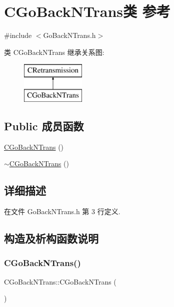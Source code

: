 \hypertarget{class_c_go_back_n_trans}{}\section{C\+Go\+Back\+N\+Trans类 参考}
\label{class_c_go_back_n_trans}


{\ttfamily \#include $<$Go\+Back\+N\+Trans.\+h$>$}

类 C\+Go\+Back\+N\+Trans 继承关系图\+:\begin{figure}[H]
\begin{center}
\leavevmode
\includegraphics[height=2.000000cm]{class_c_go_back_n_trans}
\end{center}
\end{figure}
\subsection*{Public 成员函数}
\begin{DoxyCompactItemize}
\item 
\hyperlink{class_c_go_back_n_trans_a75357c4a28d9948f86d317045f44fb62}{C\+Go\+Back\+N\+Trans} ()
\item 
\hyperlink{class_c_go_back_n_trans_aacaab4e6b5a5d2bae788a10f3c78d417}{$\sim$\+C\+Go\+Back\+N\+Trans} ()
\end{DoxyCompactItemize}


\subsection{详细描述}


在文件 Go\+Back\+N\+Trans.\+h 第 3 行定义.



\subsection{构造及析构函数说明}
\mbox{\label{class_c_go_back_n_trans_a75357c4a28d9948f86d317045f44fb62}} 
\subsubsection{\texorpdfstring{C\+Go\+Back\+N\+Trans()}{CGoBackNTrans()}}
{\footnotesize\ttfamily C\+Go\+Back\+N\+Trans\+::\+C\+Go\+Back\+N\+Trans (\begin{DoxyParamCaption}{ }\end{DoxyParamCaption})}



